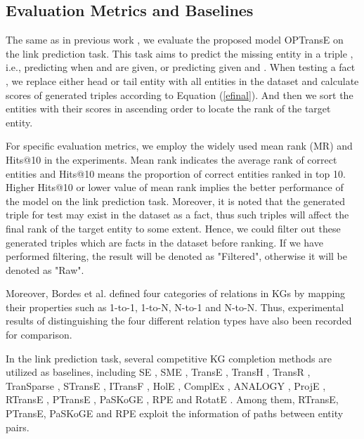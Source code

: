 \documentclass[11pt,a4paper]{article}
\begin{document}
\subsection{Evaluation Metrics and Baselines}

The same as in previous work
\cite{bordes2013translating,nguyen2016stranse}, we evaluate the
proposed model OPTransE on the link prediction task. This task aims
to predict the missing entity in a triple , i.e.,
predicting  when  and  are given, or predicting 
given  and . When testing a fact , we replace
either head or tail entity with all entities in the dataset and
calculate scores of generated triples according to Equation
(\ref{efinal}). And then we sort the entities with their scores in
ascending order to locate the rank of the target entity.

For specific evaluation metrics, we employ the widely used mean rank
(MR) and Hits@10 in the experiments. Mean rank indicates the average
rank of correct entities and Hits@10 means the proportion of correct
entities ranked in top 10. Higher Hits@10 or lower value of mean
rank implies the better performance of the model on the link
prediction task. Moreover, it is noted that the generated triple for
test may exist in the dataset as a fact, thus such triples will
affect the final rank of the target entity to some extent. Hence, we
could filter out these generated triples which are facts in the
dataset before ranking. If we have performed filtering, the result
will be denoted as "Filtered", otherwise it will be denoted as
"Raw".

Moreover, Bordes et al.  defined
four categories of relations in KGs by mapping their properties such
as 1-to-1, 1-to-N, N-to-1 and N-to-N. Thus, experimental results of
distinguishing  the four different relation types have also been
recorded for comparison.

In the link prediction task, several competitive KG completion
methods are utilized as baselines, including SE
\cite{bordes2011learning}, SME \cite{bordes2014semantic}, TransE
\cite{bordes2013translating}, TransH \cite{wang2014knowledge},
TransR \cite{lin2015learning}, TranSparse \cite{ji2016knowledge},
STransE \cite{nguyen2016stranse}, ITransF
\cite{xie2017interpretable}, HolE \cite{nickel2016holographic},
ComplEx \cite{trouillon2016complex}, ANALOGY
\cite{liu2017analogical}, ProjE \cite{shi2017proje}, RTransE
\cite{garcia2015composing}, PTransE \cite{lin2015modeling}, PaSKoGE
\cite{jia2018path}, RPE \cite{lin2018relation} and RotatE \cite{sun2019rotate}. Among them,
RTransE, PTransE, PaSKoGE and RPE exploit the information of
paths between entity pairs.
\end{document}
